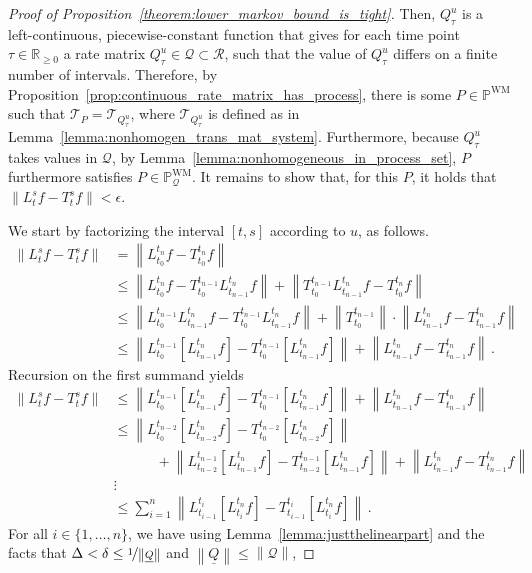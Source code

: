 \documentclass[10pt]{paper}
\theoremstyle{definition}
\newcommand{\reals}{\mathbb{R}}
\newcommand{\realsnonneg}{\reals_{\geq 0}}
\newcommand{\processes}{\mathbb{P}}
\newcommand{\wmprocesses}{\processes^{\mathrm{WM}}}
\newcommand{\rateset}{\mathcal{Q}}
\newcommand{\lrate}{\underline{Q}}
\newcommand{\norm}[1]{\left\lVert #1 \right\rVert}
\begin{document}
\begin{proof}[Proof of Proposition~\ref{theorem:lower_markov_bound_is_tight}]
Then, $Q_\tau^u$ is a left-continuous, piecewise-constant function that gives for each time point $\tau\in\realsnonneg$ a rate matrix $Q_\tau^u\in\rateset\subset\mathcal{R}$, such that the value of $Q_\tau^u$ differs on a finite number of intervals. Therefore, by Proposition~\ref{prop:continuous_rate_matrix_has_process}, there is some $P\in\wmprocesses$ such that $\mathcal{T}_P=\mathcal{T}_{Q_\tau^u}$, where $\mathcal{T}_{Q_\tau^u}$ is defined as in Lemma~\ref{lemma:nonhomogen_trans_mat_system}. Furthermore, because $Q_\tau^u$ takes values in $\rateset$, by Lemma~\ref{lemma:nonhomogeneous_in_process_set}, $P$ furthermore satisfies $P\in\wmprocesses_\rateset$. It remains to show that, for this $P$, it holds that $\norm{L_t^sf - T_t^sf}<\epsilon$. 

We start by factorizing the interval $[t,s]$ according to $u$, as follows.
\begin{align*}
\norm{L_t^sf - T_t^sf} &= \norm{L_{t_0}^{t_n}f - T_{t_0}^{t_n}f} \\
 &\leq \norm{L_{t_0}^{t_n}f - T_{t_0}^{t_{n-1}}L_{t_{n-1}}^{t_n}f} + \norm{T_{t_0}^{t_{n-1}}L_{t_{n-1}}^{t_n}f - T_{t_0}^{t_n}f} \\
 &\leq \norm{L_{t_0}^{t_{n-1}}L_{t_{n-1}}^{t_n}f - T_{t_0}^{t_{n-1}}L_{t_{n-1}}^{t_n}f} + \norm{{T_{t_0}^{t_{n-1}}}}\cdot\norm{L_{t_{n-1}}^{t_n}f - T_{t_{n-1}}^{t_n}f} \\
 &\leq \norm{L_{t_0}^{t_{n-1}}\left[L_{t_{n-1}}^{t_n}f\right] - T_{t_0}^{t_{n-1}}\left[L_{t_{n-1}}^{t_n}f\right]} + \norm{L_{t_{n-1}}^{t_n}f - T_{t_{n-1}}^{t_n}f} \,.
\end{align*}
Recursion on the first summand yields
\begin{align*}
\norm{L_t^sf - T_t^sf} &\leq \norm{L_{t_0}^{t_{n-1}}\left[L_{t_{n-1}}^{t_n}f\right] - T_{t_0}^{t_{n-1}}\left[L_{t_{n-1}}^{t_n}f\right]} + \norm{L_{t_{n-1}}^{t_n}f - T_{t_{n-1}}^{t_n}f} \\
 &\leq \norm{L_{t_0}^{t_{n-2}}\left[L_{t_{n-2}}^{t_n}f\right] - T_{t_0}^{t_{n-2}}\left[L_{t_{n-2}}^{t_n}f\right]} \\
 &\quad\quad\quad+ \norm{L_{t_{n-2}}^{t_{n-1}}\left[L_{t_{n-1}}^{t_n}f\right] - T_{t_{n-2}}^{t_{n-1}}\left[L_{t_{n-1}}^{t_n}f\right]} + \norm{L_{t_{n-1}}^{t_n}f - T_{t_{n-1}}^{t_n}f} \\
&\vdots \\
 &\leq \sum_{i=1}^{n} \norm{L_{t_{i-1}}^{t_i}\left[L_{t_i}^{t_n}f\right] - T_{t_{i-1}}^{t_i}\left[L_{t_i}^{t_n}f\right]}\,.
\end{align*}
For all $i\in\{1,\ldots,n\}$, we have using Lemma~\ref{lemma:justthelinearpart} and the facts that $\Delta<\delta\leq\nicefrac{1}{\norm{\lrate}}$ and $\norm{\lrate}\leq\norm{\rateset}$,

\end{proof}
\end{document}
